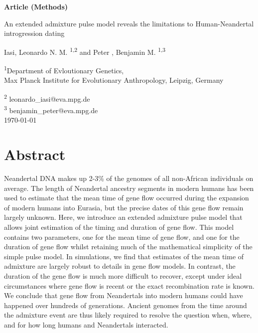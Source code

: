 \documentclass[11pt]{article}
\begin{document}
\begin{titlepage}

    \begin{flushright}
        \large
        \textbf{Article (Methods)}
    \end{flushright}


        \vspace*{1cm}
    \begin{center}       
        \Huge
        \vspace{1cm}
        An extended admixture pulse model reveals the limitations to Human-Neandertal introgression dating
        
        \vspace{1.0cm}
        \large
        Iasi, Leonardo N. M. \textsuperscript{1,2} and Peter , Benjamin M. \textsuperscript{1,3} \\ 
        
        \vspace{1.0cm}
        
        \textsuperscript{1}Department of Evloutionary Genetics, \\ 
        Max Planck Institute for Evolutionary Anthropology, Leipzig, Germany
        
        \vspace{1.0cm}
        \textsuperscript{2} leonardo\_iasi@eva.mpg.de \\ \textsuperscript{3} 
        benjamin\_peter@eva.mpg.de \\
        \vspace{1.0cm}
        \today
    \end{center}  
     

            

\end{titlepage}


\section{Abstract}\label{abstract}

Neandertal DNA makes up 2-3\% of the genomes of all non-African individuals on average. The length of Neandertal ancestry segments in modern humans has been used to estimate that the mean time of gene flow occurred during the expansion of modern humans into Eurasia, but the precise dates of this gene flow remain largely unknown. Here, we introduce an extended admixture pulse model that allows joint estimation of the timing and duration of gene flow. This model contains two parameters, one for the mean time of gene flow, and one for the duration of gene flow whilst retaining much of the mathematical simplicity of the simple pulse model. In simulations, we find that estimates of the mean time of admixture are largely robust to details in gene flow models. In contrast, the duration of the gene flow is much more difficult to recover, except under ideal circumstances where gene flow is recent or the exact recombination rate is known. We conclude that gene flow from Neandertals into modern humans could have happened over hundreds of generations. Ancient genomes from the time around the admixture event are thus likely required to resolve the question when, where, and for how long humans and Neandertals interacted.
\end{document}
